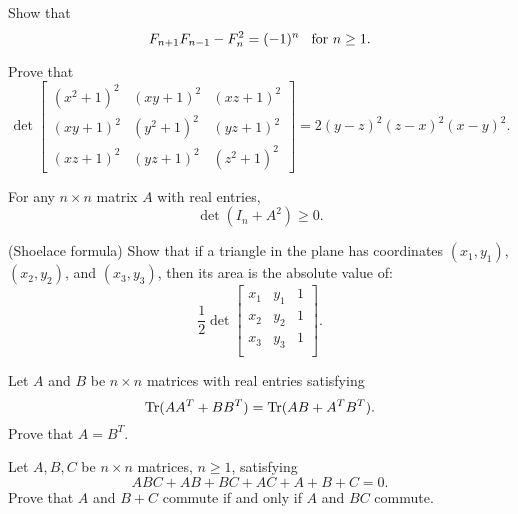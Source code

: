 \documentclass[12pt]{article}
\begin{document}
        \begin{exercise}
        Show that 
        \[F_{n + 1}F_{n - 1} - F_{n}^{2} = (-1)^{n} \hspace*{3mm} \text{for } n \geq 1. 
        \]
        \end{exercise}
        
        \begin{exercise}
        Prove that 
        \[
        \det \begin{bmatrix}
        (x^{2} + 1)^{2}&(xy + 1)^{2}&(xz + 1)^{2}\\
        (xy + 1)^{2}&(y^{2} + 1)^{2}&(yz + 1)^{2}\\
        (xz + 1)^{2}&(yz + 1)^{2}&(z^{2} + 1)^{2}
        \end{bmatrix} = 2(y - z)^{2}(z - x)^{2}(x - y)^{2}.\]
        \end{exercise}
        
        \begin{exercise}
        For any $n \times n$ matrix $A$ with real entries,
        \[
        \det(I_{n} + A^{2}) \geq 0.
        \]
        \end{exercise}
        
        \begin{exercise}
        (Shoelace formula) Show that if a triangle in the plane has coordinates $(x_{1}, y_{1})$, $(x_{2}, y_{2})$, and $(x_{3}, y_{3})$, then its area is the absolute value of:
        \[\frac{1}{2} \det \begin{bmatrix}
        x_{1}&y_{1}&1\\
        x_{2}&y_{2}&1\\
        x_{3}&y_{3}&1\\
        \end{bmatrix}.
        \]
        \end{exercise}

        \begin{exercise}
            Let $A$ and $B$ be $n \times n$ matrices with real entries satisfying 
            \[\operatorname{Tr}(A A^{T} + B B^{T}) = \operatorname{Tr}(AB + A^{T}B^{T}).  
            \]
            Prove that $A = B^{T}$. 
            \end{exercise}
            
            \begin{exercise}
                Let $A, B, C$ be $n \times n$ matrices, $n \geq 1$, satisfying 
            \[ABC + AB + BC + AC + A + B + C = 0.
            \]
            Prove that $A$ and $B + C$ commute if and only if $A$ and $BC$ commute. 
            \end{exercise}
            
\end{document}
